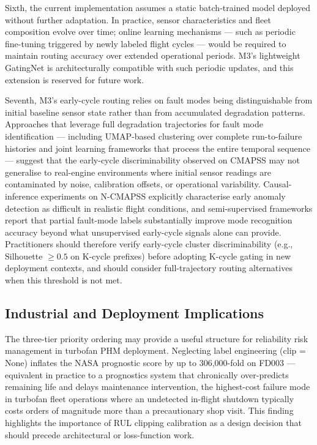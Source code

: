 \documentclass[review,12pt]{elsarticle}
\begin{document}
Sixth, the current implementation assumes a static batch-trained model deployed without further adaptation. In practice, sensor characteristics and fleet composition evolve over time; online learning mechanisms — such as periodic fine-tuning triggered by newly labeled flight cycles — would be required to maintain routing accuracy over extended operational periods. M3's lightweight GatingNet is architecturally compatible with such periodic updates, and this extension is reserved for future work.

Seventh, M3's early-cycle routing relies on fault modes being distinguishable from initial baseline sensor state rather than from accumulated degradation patterns. Approaches that leverage full degradation trajectories for fault mode identification \cite{ref46,ref47} — including UMAP-based clustering over complete run-to-failure histories and joint learning frameworks that process the entire temporal sequence — suggest that the early-cycle discriminability observed on CMAPSS may not generalise to real-engine environments where initial sensor readings are contaminated by noise, calibration offsets, or operational variability. Causal-inference experiments on N-CMAPSS \cite{ref48} explicitly characterise early anomaly detection as difficult in realistic flight conditions, and semi-supervised frameworks \cite{ref49} report that partial fault-mode labels substantially improve mode recognition accuracy beyond what unsupervised early-cycle signals alone can provide. Practitioners should therefore verify early-cycle cluster discriminability (e.g., Silhouette $\geq 0.5$ on K-cycle prefixes) before adopting K-cycle gating in new deployment contexts, and should consider full-trajectory routing alternatives when this threshold is not met.

\subsection{Industrial and Deployment Implications}

The three-tier priority ordering may provide a useful structure for reliability risk management in turbofan PHM deployment. Neglecting label engineering (clip = None) inflates the NASA prognostic score by up to 306,000-fold on FD003 — equivalent in practice to a prognostics system that chronically over-predicts remaining life and delays maintenance intervention, the highest-cost failure mode in turbofan fleet operations where an undetected in-flight shutdown typically costs orders of magnitude more than a precautionary shop visit. This finding highlights the importance of RUL clipping calibration as a design decision that should precede architectural or loss-function work.
\end{document}
